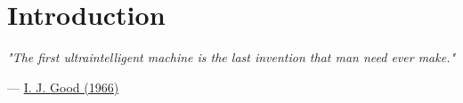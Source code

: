\documentclass{article}
\begin{document}
\newpage
{
  \hypersetup{linkcolor=Plum, linktoc=page}
  \tableofcontents
}
\clearpage

\clearpage

\section{Introduction}
\label{sec:Introduction}

\begin{tcolorbox}[colback=brown!20!white, colframe=brown!20!white]

{\centering
\textit{"The first ultraintelligent machine is the last invention that man need ever make."}\par
}
\noindent\hfill--- \hyperlink{cite.good1966speculations}{I. J. Good (1966)}\par

\end{tcolorbox}
\end{document}
